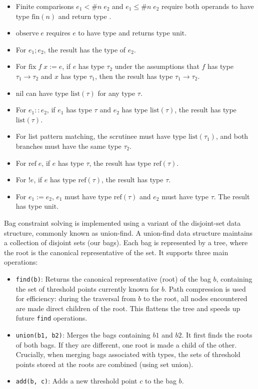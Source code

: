 \documentclass[acmsmall,screen,dvipsnames,x11names,nonacm,anonymous,review]{acmart}
\begin{document}
\begin{itemize}
    \item Finite comparisons $e_1 <\#n\; e_2$ and $e_1 \leq\#n\; e_2$ require both operands to have type $\text{fin}(n)$ and return type \bool.
    \item $\text{observe}\; e$ requires $e$ to have type \bool{} and returns type $\text{unit}$.
    \item For $e_1; e_2$, the result has the type of $e_2$.
    \item For $\text{fix}\; f\; x := e$, if $e$ has type $\tau_2$ under the assumptions that $f$ has type $\tau_1 \rightarrow \tau_2$ and $x$ has type $\tau_1$, then the result has type $\tau_1 \rightarrow \tau_2$.
    \item $\text{nil}$ can have type $\text{list}(\tau)$ for any type $\tau$.
    \item For $e_1 :: e_2$, if $e_1$ has type $\tau$ and $e_2$ has type $\text{list}(\tau)$, the result has type $\text{list}(\tau)$.
    \item For list pattern matching, the scrutinee must have type $\text{list}(\tau_1)$, and both branches must have the same type $\tau_2$.
    \item For $\text{ref}\; e$, if $e$ has type $\tau$, the result has type $\text{ref}(\tau)$.
    \item For $!e$, if $e$ has type $\text{ref}(\tau)$, the result has type $\tau$.
    \item For $e_1 := e_2$, $e_1$ must have type $\text{ref}(\tau)$ and $e_2$ must have type $\tau$. The result has type $\text{unit}$.
\end{itemize}

Bag constraint solving is implemented using a variant of the disjoint-set data structure, commonly known as union-find.
A union-find data structure maintains a collection of disjoint sets (our bags). Each bag is represented by a tree, where the root is the canonical representative of the set. It supports three main operations:
\begin{itemize}
    \item \texttt{find(b)}: Returns the canonical representative (root) of the bag $b$, containing the set of threshold points currently known for $b$. Path compression is used for efficiency: during the traversal from $b$ to the root, all nodes encountered are made direct children of the root. This flattens the tree and speeds up future \texttt{find} operations.
    \item \texttt{union(b1, b2)}: Merges the bags containing $b1$ and $b2$. It first finds the roots of both bags. If they are different, one root is made a child of the other. Crucially, when merging bags associated with \float{} types, the sets of threshold points stored at the roots are combined (using set union).
    \item \texttt{add(b, c)}: Adds a new threshold point $c$ to the bag $b$.
\end{itemize}
\end{document}
